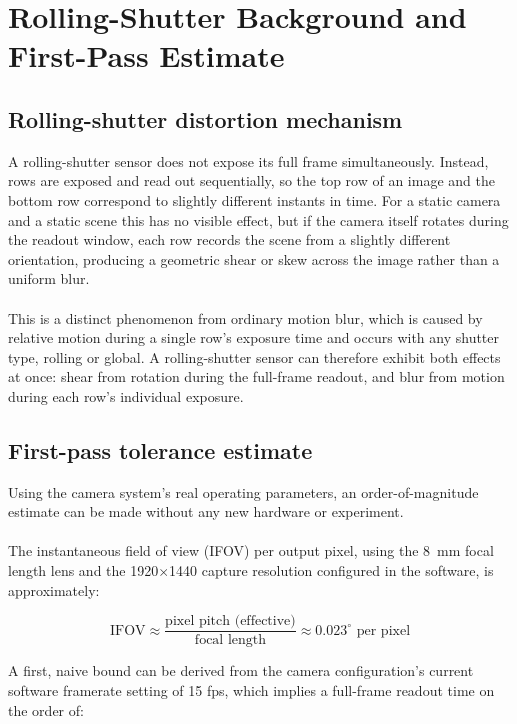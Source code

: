 \chapter{Rolling-Shutter Background and First-Pass Estimate}
\label{chap:rs-background}

\section{Rolling-shutter distortion mechanism}

A rolling-shutter sensor does not expose its full frame simultaneously. Instead, rows are exposed and read out sequentially, so the top row of an image and the bottom row correspond to slightly different instants in time. For a static camera and a static scene this has no visible effect, but if the camera itself rotates during the readout window, each row records the scene from a slightly different orientation, producing a geometric shear or skew across the image rather than a uniform blur.
\\\\
This is a distinct phenomenon from ordinary motion blur, which is caused by relative motion during a single row's exposure time and occurs with any shutter type, rolling or global. A rolling-shutter sensor can therefore exhibit both effects at once: shear from rotation during the full-frame readout, and blur from motion during each row's individual exposure.

\section{First-pass tolerance estimate}
\label{sec:first-pass-estimate}

Using the camera system's real operating parameters, an order-of-magnitude estimate can be made without any new hardware or experiment.
\\\\
The instantaneous field of view (IFOV) per output pixel, using the 8~mm focal length lens and the 1920$\times$1440 capture resolution configured in the software, is approximately:

\begin{equation}
\text{IFOV} \approx \frac{\text{pixel pitch (effective)}}{\text{focal length}} \approx 0.023^\circ \text{ per pixel}
\end{equation}

A first, naive bound can be derived from the camera configuration's current software framerate setting of 15 fps, which implies a full-frame readout time on the order of:

